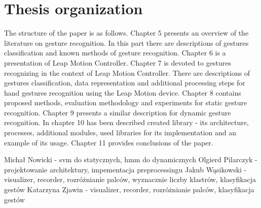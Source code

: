 \section{Thesis organization}
The structure of the paper is as follows. Chapter 5 presents an overview of the literature on gesture recognition. In this part there are descriptions of gestures classification and known methods of gesture recognition. Chapter 6 is a presentation of Leap Motion Controller. Chapter 7 is devoted to gestures recognizing in the context of Leap Motion Controller. There are descriptions of gestures classification, data representation and additional processing steps for hand gestures recognition using the Leap Motion device. Chapter 8 contains proposed methods, evaluation methodology and experiments for static gesture recognition. Chapter 9 presents a similar description for dynamic gesture recognition. In chapter 10 has been described created library - its architecture, processes, additional modules, used libraries for its implementation and an example of its usage. Chapter 11 provides conclusions of the paper.

{\color{red} Michał Nowicki - svm do statycznych, hmm do dynamicznych
Olgierd Pilarczyk - projektowanie architektury, impementacja preprocessingu
Jakub Wąsikowski - visualizer, recorder, rozróżnianie palców, wyznacznie liczby klastrów, klasyfikacja gestów
Katarzyna Zjawin - visualizer, recorder, rozróżnianie palców, klasyfikacja gestów}